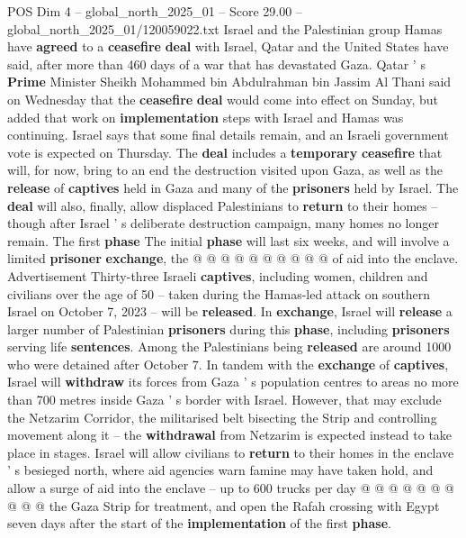 \begin{textsample}{POS Dim 4 – global\_north\_2025\_01 – Score 29.00 – global\_north\_2025\_01/120059022.txt}  \label{ex:f4_pos_046}
Israel and the Palestinian group Hamas have \textbf{agreed} to a \textbf{ceasefire} \textbf{deal} with Israel, Qatar and the United States have said, after more than 460 days of a war that has devastated Gaza.
Qatar ' s \textbf{Prime} Minister Sheikh Mohammed bin Abdulrahman bin Jassim Al Thani said on Wednesday that the \textbf{ceasefire} \textbf{deal} would come into effect on Sunday, but added that work on \textbf{implementation} steps with Israel and Hamas was continuing.
Israel says that some final details remain, and an Israeli government vote is expected on Thursday.
The \textbf{deal} includes a \textbf{temporary} \textbf{ceasefire} that will, for now, bring to an end the destruction visited upon Gaza, as well as the \textbf{release} of \textbf{captives} held in Gaza and many of the \textbf{prisoners} held by Israel.
The \textbf{deal} will also, finally, allow displaced Palestinians to \textbf{return} to their homes -- though after Israel ' s deliberate destruction campaign, many homes no longer remain.
The first \textbf{phase} The initial \textbf{phase} will last six weeks, and will involve a limited \textbf{prisoner} \textbf{exchange}, the @ @ @ @ @ @ @ @ @ @ of aid into the enclave.
Advertisement Thirty-three Israeli \textbf{captives}, including women, children and civilians over the age of 50 -- taken during the Hamas-led attack on southern Israel on October 7, 2023 -- will be \textbf{released}.
In \textbf{exchange}, Israel will \textbf{release} a larger number of Palestinian \textbf{prisoners} during this \textbf{phase}, including \textbf{prisoners} serving life \textbf{sentences}.
Among the Palestinians being \textbf{released} are around 1000 who were detained after October 7.
In tandem with the \textbf{exchange} of \textbf{captives}, Israel will \textbf{withdraw} its forces from Gaza ' s population centres to areas no more than 700 metres inside Gaza ' s border with Israel.
However, that may exclude the Netzarim Corridor, the militarised belt bisecting the Strip and controlling movement along it -- the \textbf{withdrawal} from Netzarim is expected instead to take place in stages.
Israel will allow civilians to \textbf{return} to their homes in the enclave ' s besieged north, where aid agencies warn famine may have taken hold, and allow a surge of aid into the enclave -- up to 600 trucks per day @ @ @ @ @ @ @ @ @ @ the Gaza Strip for treatment, and open the Rafah crossing with Egypt seven days after the start of the \textbf{implementation} of the first \textbf{phase}.

\end{textsample}
